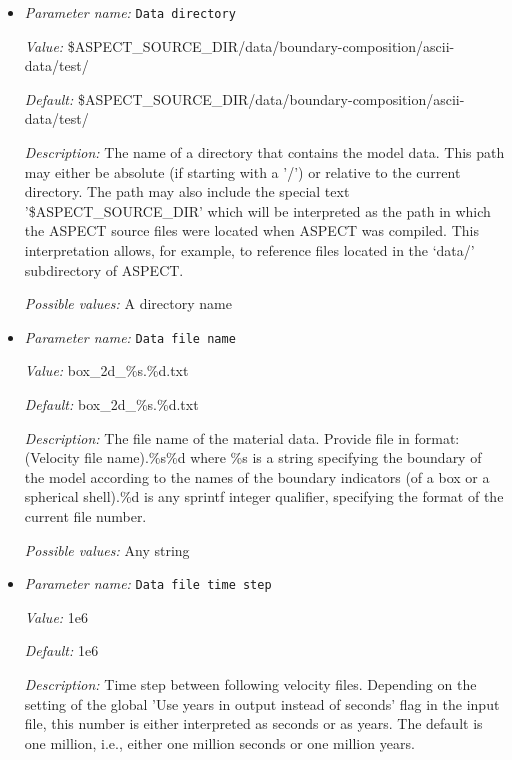 \begin{itemize}
\item {\it Parameter name:} {\tt Data directory}
\label{parameters:Boundary composition model/Ascii data model/Data directory}


{\it Value:} \$ASPECT\_SOURCE\_DIR/data/boundary-composition/ascii-data/test/


{\it Default:} \$ASPECT\_SOURCE\_DIR/data/boundary-composition/ascii-data/test/


{\it Description:} The name of a directory that contains the model data. This path may either be absolute (if starting with a '/') or relative to the current directory. The path may also include the special text '\$ASPECT\_SOURCE\_DIR' which will be interpreted as the path in which the ASPECT source files were located when ASPECT was compiled. This interpretation allows, for example, to reference files located in the `data/' subdirectory of ASPECT. 


{\it Possible values:} A directory name
\item {\it Parameter name:} {\tt Data file name}
\label{parameters:Boundary composition model/Ascii data model/Data file name}


{\it Value:} box\_2d\_\%s.\%d.txt


{\it Default:} box\_2d\_\%s.\%d.txt


{\it Description:} The file name of the material data. Provide file in format: (Velocity file name).\%s\%d where \%s is a string specifying the boundary of the model according to the names of the boundary indicators (of a box or a spherical shell).\%d is any sprintf integer qualifier, specifying the format of the current file number. 


{\it Possible values:} Any string
\item {\it Parameter name:} {\tt Data file time step}
\label{parameters:Boundary composition model/Ascii data model/Data file time step}


{\it Value:} 1e6


{\it Default:} 1e6


{\it Description:} Time step between following velocity files. Depending on the setting of the global 'Use years in output instead of seconds' flag in the input file, this number is either interpreted as seconds or as years. The default is one million, i.e., either one million seconds or one million years.



\end{itemize}
